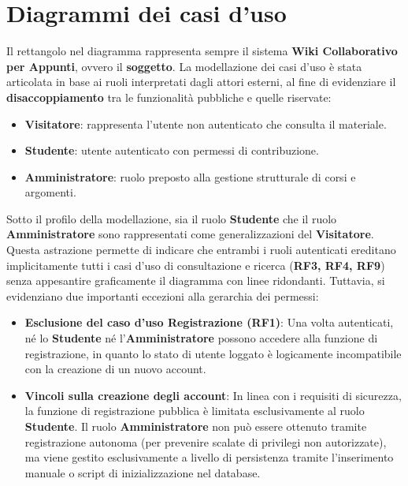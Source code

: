 \chapter{Diagrammi dei casi d'uso}
\noindent Il rettangolo nel diagramma rappresenta sempre il sistema \textbf{Wiki Collaborativo per Appunti}, ovvero il \textbf{soggetto}. La modellazione dei casi d’uso è stata articolata in base ai ruoli interpretati dagli attori esterni, al fine di evidenziare il \textbf{disaccoppiamento} tra le funzionalità pubbliche e quelle riservate:

\begin{itemize}[]
    \item \textbf{Visitatore}: rappresenta l'utente non autenticato che consulta il materiale.
    \item \textbf{Studente}: utente autenticato con permessi di contribuzione.
    \item \textbf{Amministratore}: ruolo preposto alla gestione strutturale di corsi e argomenti.
\end{itemize}

\noindent Sotto il profilo della modellazione, sia il ruolo \textbf{Studente} che il ruolo \textbf{Amministratore} sono rappresentati come generalizzazioni del \textbf{Visitatore}. Questa astrazione permette di indicare che entrambi i ruoli autenticati ereditano implicitamente tutti i casi d’uso di consultazione e ricerca (\textbf{RF3, RF4, RF9}) senza appesantire graficamente il diagramma con linee ridondanti.
Tuttavia, si evidenziano due importanti eccezioni alla gerarchia dei permessi:


\begin{itemize}[]
    \item \textbf{Esclusione del caso d'uso Registrazione (RF1)}: Una volta autenticati, né lo \textbf{Studente} né l'\textbf{Amministratore} possono accedere alla funzione di registrazione, in quanto lo stato di utente loggato è logicamente incompatibile con la creazione di un nuovo account.
    \item \textbf{Vincoli sulla creazione degli account}: In linea con i requisiti di sicurezza, la funzione di registrazione pubblica è limitata esclusivamente al ruolo \textbf{Studente}. Il ruolo \textbf{Amministratore} non può essere ottenuto tramite registrazione autonoma (per prevenire scalate di privilegi non autorizzate), ma viene gestito esclusivamente a livello di persistenza tramite l'inserimento manuale o script di inizializzazione nel database.
\end{itemize}

